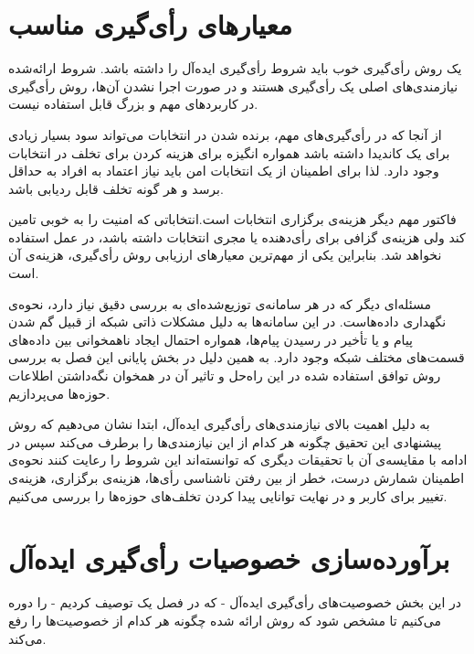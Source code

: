 \section{معیار‌های رأی‌گیری مناسب}
یک روش رأی‌گیری خوب باید  شروط رأی‌گیری ایده‌آل را داشته باشد. شروط ارائه‌شده نیازمندی‌های اصلی یک رأی‌گیری هستند و در صورت اجرا نشدن آن‌ها، روش رأی‌گیری در کاربرد‌های مهم و بزرگ قابل استفاده نیست. 
\par 
از آنجا که در رأی‌گیری‌های مهم، برنده شدن در انتخابات می‌تواند سود بسیار زیادی برای یک کاندیدا داشته باشد همواره انگیزه برای هزینه کردن برای تخلف در انتخابات وجود دارد. لذا برای اطمینان از یک انتخابات امن باید نیاز اعتماد به افراد به حداقل برسد و هر گونه تخلف قابل ردیابی باشد. 
\par 
فاکتور مهم دیگر هزینه‌ی برگزاری انتخابات است.انتخاباتی که امنیت را به خوبی تامین کند ولی هزینه‌ی گزافی برای رأی‌دهنده یا مجری انتخابات داشته باشد، در عمل استفاده نخواهد شد. بنابراین یکی از مهم‌ترین معیارهای ارزیابی روش رأی‌گیری، هزینه‌ی آن است. 
\par 
مسئله‌ای دیگر که در هر سامانه‌ی توزیع‌شده‌ای به بررسی دقیق نیاز دارد، نحوه‌ی نگهداری داده‌هاست. در این سامانه‌ها به دلیل مشکلات ذاتی شبکه از قبیل گم شدن پیام و یا تأخیر در رسیدن پیام‌ها، همواره احتمال ایجاد ناهمخوانی بین داده‌های قسمت‌های مختلف شبکه وجود دارد. به همین دلیل در بخش پایانی این فصل به بررسی روش توافق استفاده شده در این راه‌حل و تاثیر آن در همخوان نگه‌داشتن اطلاعات حوزه‌ها می‌پردازیم. 
\par
به دلیل اهمیت بالای نیازمندی‌های رأی‌گیری ایده‌آل، ابتدا نشان می‌دهیم که روش پیشنهادی این تحقیق چگونه هر کدام از این نیازمندی‌ها را برطرف می‌کند سپس در ادامه با مقایسه‌ی آن با تحقیقات دیگری که توانسته‌اند این شروط را رعایت کنند نحوه‌ی اطمینان شمارش درست، خطر از بین رفتن ناشناسی رأی‌ها، هزینه‌ی برگزاری، هزینه‌ی تغییر برای کاربر و در نهایت توانایی پیدا کردن تخلف‌های حوزه‌ها را بررسی می‌کنیم.
\section{برآورده‌سازی خصوصیات رأی‌گیری ایده‌آل}
در این بخش خصوصیت‌‌های رأی‌گیری ایده‌آل - که در فصل یک توصیف کردیم - را دوره می‌کنیم تا مشخص شود که روش ارائه شده چگونه هر کدام از خصوصیت‌ها را رفع می‌کند.

